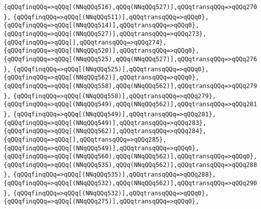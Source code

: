 \verb|{qQQqfinqQQq=>qQQq[(NNqQQq516),qQQq(NNqQQq527)],qQQqtransqQQq=>qQQq270},|\newline
\verb|{qQQqfinqQQq=>qQQq[(NNqQQq511)],qQQqtransqQQq=>qQQq0},|\newline
\verb|{qQQqfinqQQq=>qQQq[(NNqQQq514)],qQQqtransqQQq=>qQQq0},|\newline
\verb|{qQQqfinqQQq=>qQQq[(NNqQQq527)],qQQqtransqQQq=>qQQq273},|\newline
\verb|{qQQqfinqQQq=>qQQq[],qQQqtransqQQq=>qQQq274},|\newline
\verb|{qQQqfinqQQq=>qQQq[(NNqQQq520)],qQQqtransqQQq=>qQQq0},|\newline
\verb|{qQQqfinqQQq=>qQQq[(NNqQQq525),qQQq(NNqQQq527)],qQQqtransqQQq=>qQQq276},|\newline
\verb|{qQQqfinqQQq=>qQQq[(NNqQQq525)],qQQqtransqQQq=>qQQq0},|\newline
\verb|{qQQqfinqQQq=>qQQq[(NNqQQq562)],qQQqtransqQQq=>qQQq0},|\newline
\verb|{qQQqfinqQQq=>qQQq[(NNqQQq558),qQQq(NNqQQq562)],qQQqtransqQQq=>qQQq279},|\newline
\verb|{qQQqfinqQQq=>qQQq[(NNqQQq558)],qQQqtransqQQq=>qQQq279},|\newline
\verb|{qQQqfinqQQq=>qQQq[(NNqQQq549),qQQq(NNqQQq562)],qQQqtransqQQq=>qQQq281},|\newline
\verb|{qQQqfinqQQq=>qQQq[(NNqQQq549)],qQQqtransqQQq=>qQQq281},|\newline
\verb|{qQQqfinqQQq=>qQQq[(NNqQQq549)],qQQqtransqQQq=>qQQq283},|\newline
\verb|{qQQqfinqQQq=>qQQq[(NNqQQq562)],qQQqtransqQQq=>qQQq284},|\newline
\verb|{qQQqfinqQQq=>qQQq[],qQQqtransqQQq=>qQQq285},|\newline
\verb|{qQQqfinqQQq=>qQQq[(NNqQQq549)],qQQqtransqQQq=>qQQq0},|\newline
\verb|{qQQqfinqQQq=>qQQq[(NNqQQq560),qQQq(NNqQQq562)],qQQqtransqQQq=>qQQq0},|\newline
\verb|{qQQqfinqQQq=>qQQq[(NNqQQq535),qQQq(NNqQQq562)],qQQqtransqQQq=>qQQq288},|\newline
\verb|{qQQqfinqQQq=>qQQq[(NNqQQq535)],qQQqtransqQQq=>qQQq288},|\newline
\verb|{qQQqfinqQQq=>qQQq[(NNqQQq532),qQQq(NNqQQq562)],qQQqtransqQQq=>qQQq290},|\newline
\verb|{qQQqfinqQQq=>qQQq[(NNqQQq532)],qQQqtransqQQq=>qQQq0},|\newline
\verb|{qQQqfinqQQq=>qQQq[(NNqQQq275)],qQQqtransqQQq=>qQQq0},|\newline
